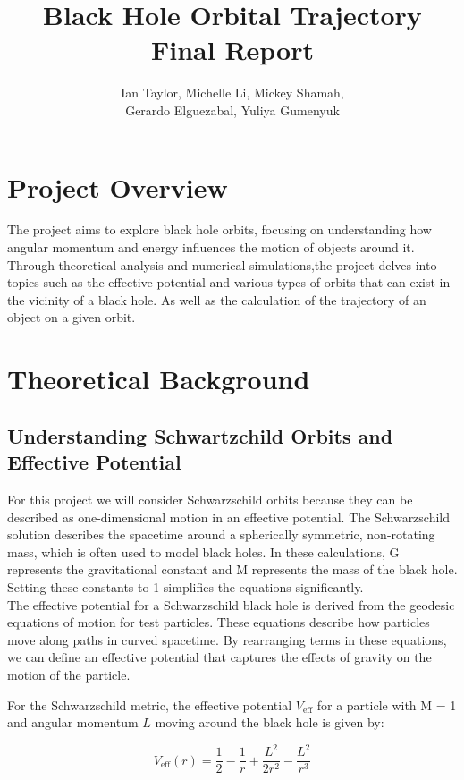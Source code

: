 \documentclass{article}
\title{Black Hole Orbital Trajectory Final Report}
\author{Ian Taylor, Michelle Li, Mickey Shamah,\\ Gerardo Elguezabal, Yuliya Gumenyuk}
\begin{document}
\maketitle

\section{Project Overview}

The project aims to explore  black hole orbits, focusing on understanding how angular momentum and energy influences the motion of objects around it.
Through theoretical analysis and numerical simulations,the project delves into topics such as the effective potential and various types of orbits that
can exist in the vicinity of a black hole. As well as the calculation of the trajectory of an object on a given orbit.

\section{Theoretical Background}

\subsection{Understanding Schwartzchild Orbits and Effective Potential}

For this project we will consider Schwarzschild orbits because they can be described as one-dimensional motion in an effective potential.
The Schwarzschild solution describes the spacetime around a spherically symmetric, non-rotating mass, which is often used to model black holes. In these calculations,
G represents the gravitational constant and M represents the mass of the black hole. Setting these constants to 1 simplifies the equations significantly.\\

The effective potential for a Schwarzschild black hole is derived from the geodesic equations of motion for test particles.
These equations describe how particles move along paths in curved spacetime. By rearranging terms in these equations,
we can define an effective potential that captures the effects of gravity on the motion of the particle.

For the Schwarzschild metric, the effective potential \( V_{\text{eff}} \) for a particle with M = 1 and angular momentum \( L \) moving around the black hole is given by:

\[
V_{\text{eff}}(r) = \frac{1}{2} - \frac{1}{r} + \frac{L^2}{2r^2} - \frac{L^2}{r^3}
\]
\end{document}
